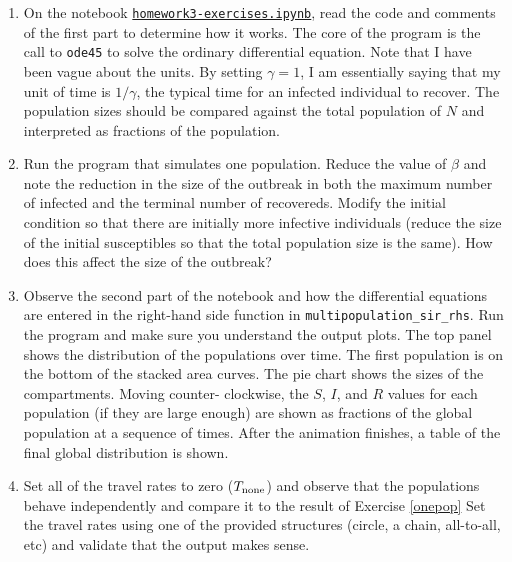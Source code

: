 \documentclass[letter]{article}
\begin{document}
\begin{enumerate}[label=\textbf{\arabic*.}]
	\item \label{onepop}On the notebook \href{https://utoronto.syzygy.ca/jupyter/user-redirect/git-pull?repo=https://github.com/bigfatbernie/IBLMathModeling&subPath=homeworks/homework3/homework3-exercises.ipynb}{\tt homework3-exercises.ipynb}, 
	read the code and comments of the first part to determine how it works. The core of the program is the call to \verb|ode45| to solve the ordinary differential equation. Note that I have been vague about the units. By setting $\gamma = 1$, I am essentially saying that my unit of time is $1/\gamma$, the typical time for an infected individual to recover. The population sizes should be compared against the total population of $N$ and interpreted as fractions of the population.
	
	\item Run the program that simulates one population. Reduce the value of $\beta$ and note the reduction in the size of the outbreak in both the maximum number of infected and the terminal number of recovereds. Modify the initial condition so that there are initially more infective individuals (reduce the size of the initial susceptibles so that the total population size is the same). How does this affect the size of the outbreak?

	\item Observe the second part of the notebook and how the 
	differential equations are entered in the right-hand side function in \verb|multipopulation_sir_rhs|. 
	Run the program and make sure you understand the output plots. The top panel shows the distribution of the populations over time. The first population is on the bottom of the stacked area curves. The pie chart shows the sizes of the compartments. Moving counter- clockwise, the $S$, $I$, and $R$ values for each population (if they are large enough) are shown as fractions of the global population at a sequence of times. After the animation finishes, a table of the final global distribution is shown.
	
	\item Set all of the travel rates to zero ($T_{\rm none}$) and observe that the populations behave independently and compare it to the result of Exercise \ref{onepop} 
	Set the travel rates using one of the provided structures (circle, a chain, all-to-all, etc) and validate that the output makes sense.


\end{enumerate}
\end{document}
